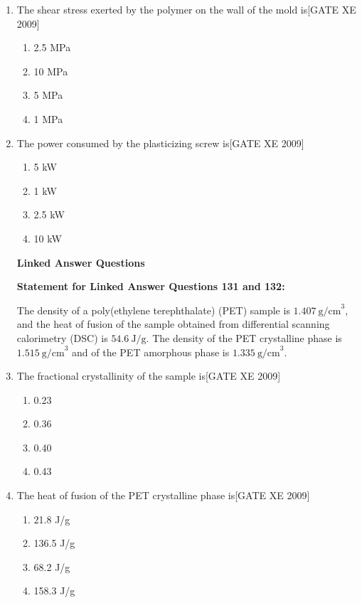 \documentclass[journal,12pt,onecolumn]{IEEEtran}
\theoremstyle{remark}
\begin{document}
\begin{enumerate}
\item The shear stress exerted by the polymer on the wall of the mold is\hfill[GATE XE 2009]
\begin{multicols}{2}
\begin{enumerate}
\item 2.5 MPa
\item 10 MPa
\item 5 MPa
\item 1 MPa
\end{enumerate}
\end{multicols}

\item The power consumed by the plasticizing screw is\hfill[GATE XE 2009]
\begin{multicols}{2}
\begin{enumerate}
\item 5 kW
\item 1 kW
\item 2.5 kW
\item 10 kW
\end{enumerate}
\end{multicols}




\textbf{Linked Answer Questions}

\textbf{Statement for Linked Answer Questions 131 and 132:}

The density of a poly(ethylene terephthalate) (PET) sample is $1.407~\text{g/cm}^3$, and the heat of fusion of the sample obtained from differential scanning calorimetry (DSC) is $54.6~\text{J/g}$. The density of the PET crystalline phase is $1.515~\text{g/cm}^3$ and of the PET amorphous phase is $1.335~\text{g/cm}^3$.


\item The fractional crystallinity of the sample is\hfill[GATE XE 2009]
\begin{multicols}{2}
\begin{enumerate}
\item 0.23
\item 0.36
\item 0.40
\item 0.43
\end{enumerate}
\end{multicols}

\item The heat of fusion of the PET crystalline phase is\hfill[GATE XE 2009]
\begin{multicols}{2}
\begin{enumerate}
\item 21.8 J/g
\item 136.5 J/g
\item 68.2 J/g
\item 158.3 J/g
\end{enumerate}
\end{multicols}





\end{enumerate}
\end{document}
